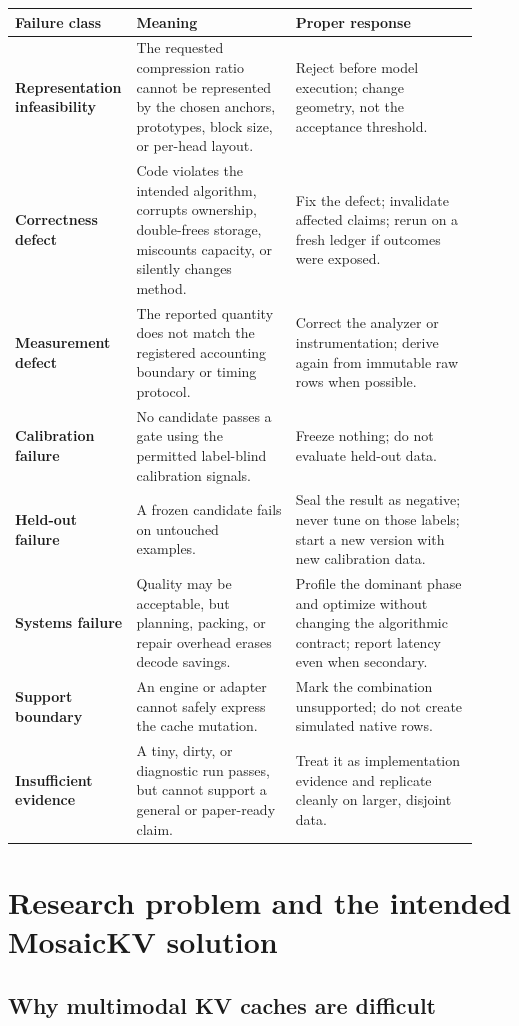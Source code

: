 \documentclass[11pt]{article}
\begin{document}
\begin{longtable}{>{\bfseries}p{0.19\linewidth}p{0.34\linewidth}p{0.39\linewidth}}
\toprule
Failure class & Meaning & Proper response \\
\midrule
\endhead
Representation infeasibility & The requested compression ratio cannot be represented by the
chosen anchors, prototypes, block size, or per-head layout. & Reject before model execution;
change geometry, not the acceptance threshold. \\
Correctness defect & Code violates the intended algorithm, corrupts ownership, double-frees
storage, miscounts capacity, or silently changes method. & Fix the defect; invalidate affected
claims; rerun on a fresh ledger if outcomes were exposed. \\
Measurement defect & The reported quantity does not match the registered accounting boundary or
timing protocol. & Correct the analyzer or instrumentation; derive again from immutable raw rows
when possible. \\
Calibration failure & No candidate passes a gate using the permitted label-blind calibration
signals. & Freeze nothing; do not evaluate held-out data. \\
Held-out failure & A frozen candidate fails on untouched examples. & Seal the result as negative;
never tune on those labels; start a new version with new calibration data. \\
Systems failure & Quality may be acceptable, but planning, packing, or repair overhead erases
decode savings. & Profile the dominant phase and optimize without changing the algorithmic
contract; report latency even when secondary. \\
Support boundary & An engine or adapter cannot safely express the cache mutation. & Mark the
combination unsupported; do not create simulated native rows. \\
Insufficient evidence & A tiny, dirty, or diagnostic run passes, but cannot support a general or
paper-ready claim. & Treat it as implementation evidence and replicate cleanly on larger,
disjoint data. \\
\bottomrule
\end{longtable}

\section{Research problem and the intended MosaicKV solution}

\subsection{Why multimodal KV caches are difficult}
\end{document}
